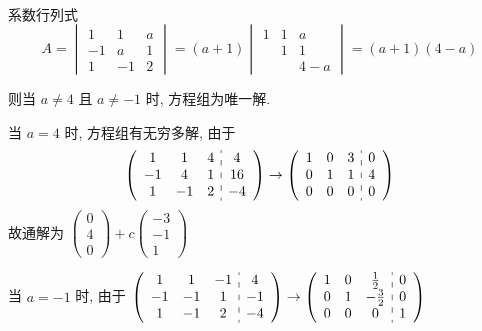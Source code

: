 	 \paragraph{} %
		 系数行列式 \[ A = \begin{vmatrix}
				 1  & 1  & a \\
				 -1 & a  & 1 \\
				 1  & -1 & 2
			 \end{vmatrix} = (a+1)\begin{vmatrix}
				 1 & 1 & a   \\
				   & 1 & 1   \\
				   &   & 4-a
			 \end{vmatrix} = (a+1)(4-a) \]

		 则当 \( a \neq 4 \) 且 \( a \neq -1 \) 时, 方程组为唯一解.

		 当 \( a = 4 \) 时, 方程组有无穷多解, 由于
		 \[ \left(\begin{array}{ccc:c}
					 1  & 1  & 4 & 4  \\
					 -1 & 4  & 1 & 16 \\
					 1  & -1 & 2 & -4
				 \end{array}\right) \rightarrow \left(\begin{array}{ccc:c}
					 1 & 0 & 3 & 0 \\
					 0 & 1 & 1 & 4 \\
					 0 & 0 & 0 & 0
				 \end{array}\right) \]
		 故通解为 \(\begin{pmatrix}
			 0 \\
			 4 \\
			 0
		 \end{pmatrix} + c\begin{pmatrix}
			 -3 \\
			 -1 \\
			 1
		 \end{pmatrix} \)

		 当 \( a = -1 \) 时, 由于 \( \left(\begin{array}{ccc:c}
				 1  & 1  & -1 & 4  \\
				 -1 & -1 & 1  & -1 \\
				 1  & -1 & 2  & -4
			 \end{array}\right) \rightarrow \left(\begin{array}{ccc:c}
				 1 & 0 & \frac{1}{2}  & 0 \\
				 0 & 1 & -\frac{3}{2} & 0 \\
				 0 & 0 & 0            & 1
			 \end{array}\right) \)

